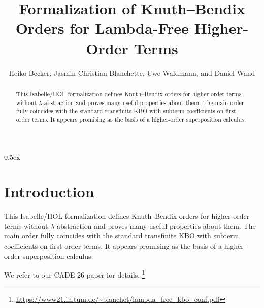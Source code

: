 \documentclass[10pt,a4paper]{article}
\begin{document}
\title{Formalization of Knuth--Bendix Orders for Lambda-Free Higher-Order Terms}
\author{Heiko Becker, Jasmin Christian Blanchette, Uwe Waldmann, and Daniel Wand}

\maketitle

\begin{abstract}
\noindent
This Isabelle/HOL formalization defines Knuth--Bendix orders for higher-order
terms without $\lambda$-ab\-strac\-tion and proves many useful properties about
them. The main order fully coincides with the standard transfinite KBO with
subterm coefficients on first-order terms. It appears promising as the basis
of a higher-order superposition calculus.
\end{abstract}

\tableofcontents

\parindent 0pt
\parskip 0.5ex

\section{Introduction}

This Isabelle/HOL formalization defines Knuth--Bendix orders for higher-order
terms without $\lambda$-abstraction and proves many useful properties about
them. The main order fully coincides with the standard transfinite KBO with
subterm coefficients on first-order terms. It appears promising as the basis
of a higher-order superposition calculus.

We refer to our CADE-26 paper for details.%
\footnote{\url{https://www21.in.tum.de/~blanchet/lambda_free_kbo_conf.pdf}}



%
%

%
%
\end{document}
